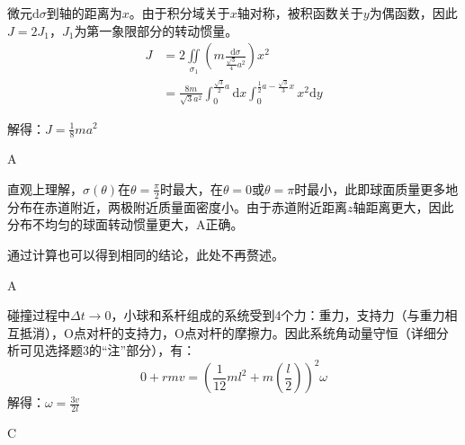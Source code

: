 \documentclass[b5paper,opensource]{qyxf-book}
\newcommand{\di}[1]{\mathrm{d}#1}
\newcommand{\zbj}[4]
{
	\draw (0,0) node[below left] {$ O $};
	\draw [->] (#1,0) -- (#2,0) node[right] {$ x $};
	\draw [->] (0,#3) -- (0,#4) node[right] {$ y $};
}
\begin{document}
\par
微元$ \di{\sigma} $到轴的距离为$ x $。由于积分域关于$ x $轴对称，被积函数关于$ y $为偶函数，因此$ J=2J_1 $，$ J_1 $为第一象限部分的转动惯量。
\begin{align*}
J&=2\iint\limits_{\sigma_1}\left(m\frac{\di{\sigma}}{\frac{\sqrt{3}}{4}a^2}\right)x^2\\
&=\frac{8m}{\sqrt{3}a^2}\int_0^{\frac{\sqrt{3}}{2}a}\di{x}\int_0^{\frac{1}{2}a-\frac{\sqrt{3}}{3}x}x^2\di{y}
\end{align*}\par
解得：$ J=\frac{1}{8}ma^2 $

A

直观上理解，$ \sigma(\theta) $在$ \theta=\frac{\pi}{2} $时最大，在$ \theta=0 $或$ \theta=\pi $时最小，此即球面质量更多地分布在赤道附近，两极附近质量面密度小。由于赤道附近距离$ z $轴距离更大，因此分布不均匀的球面转动惯量更大，A正确。\par
通过计算也可以得到相同的结论，此处不再赘述。

A

碰撞过程中$ \Delta t\to 0 $，小球和系杆组成的系统受到4个力：重力，支持力（与重力相互抵消），O点对杆的支持力，O点对杆的摩擦力。因此系统角动量守恒（详细分析可见选择题3的“注”部分），有：
			\[0+rmv=(\frac{1}{12}ml^2+m\left(\frac{l}{2}\right))^2\omega\]
			解得：$\omega=\frac{3v}{2l}$
		
C
\end{document}
